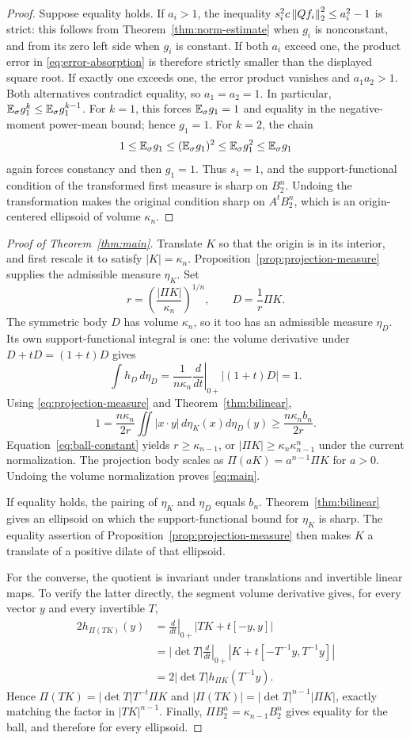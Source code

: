\begin{proof}
Suppose equality holds. If $a_i>1$, the inequality
$s_i^2c\left\lVert Qf_i\right\rVert_2^2\le a_i^2-1$ is strict: this follows from
Theorem~\ref{thm:norm-estimate} when $g_i$ is nonconstant, and from its
zero left side when $g_i$ is constant. If both $a_i$ exceed one, the
product error in \eqref{eq:error-absorption} is therefore strictly
smaller than the displayed square root. If exactly one exceeds one,
the error product vanishes and $a_1a_2>1$.
Both alternatives contradict equality, so $a_1=a_2=1$.
In particular, $\mathbb E_{\sigma} g_1^k\le\mathbb E_{\sigma} g_1^{k-1}$.
For $k=1$, this forces $\mathbb E_{\sigma} g_1=1$ and equality in the negative-moment
power-mean bound; hence $g_1=1$.
For $k=2$, the chain
\[
 1\le\mathbb E_{\sigma} g_1\le(\mathbb E_{\sigma} g_1)^2\le\mathbb E_{\sigma} g_1^2\le\mathbb E_{\sigma} g_1
\]
again forces constancy and then $g_1=1$.
Thus $s_1=1$, and the support-functional condition of the transformed
first measure is sharp on $B_2^n$. Undoing the transformation makes the
original condition sharp on $A^tB_2^n$, which is an origin-centered
ellipsoid of volume $\kappa_n$.
\end{proof}

\begin{proof}[Proof of Theorem~\ref{thm:main}]
Translate $K$ so that the origin is in its interior, and first rescale
it to satisfy $|K|=\kappa_n$.
Proposition~\ref{prop:projection-measure} supplies the admissible
measure $\eta_K$. Set
\[
 r=\left(\frac{|\Pi K|}{\kappa_n}\right)^{1/n},
 \qquad D=\frac1r\Pi K.
\]
The symmetric body $D$ has volume $\kappa_n$, so it too has an
admissible measure $\eta_D$. Its own support-functional integral is
one: the volume derivative under $D+tD=(1+t)D$ gives
\[
 \int h_D\,d\eta_D
 =\frac1{n\kappa_n}\left.\frac{d}{dt}\right|_{0+}|(1+t)D|=1.
\]
Using \eqref{eq:projection-measure} and Theorem~\ref{thm:bilinear},
\[
 1=\frac{n\kappa_n}{2r}
       \iint|x\cdot y|\,d\eta_K(x)d\eta_D(y)
   \ge\frac{n\kappa_nb_n}{2r}.
\]
Equation~\eqref{eq:ball-constant} yields $r\ge\kappa_{n-1}$, or
$|\Pi K|\ge\kappa_n\kappa_{n-1}^n$ under the current normalization.
The projection body scales as $\Pi(aK)=a^{n-1}\Pi K$ for $a>0$.
Undoing the volume normalization proves \eqref{eq:main}.

If equality holds, the pairing of $\eta_K$ and $\eta_D$ equals $b_n$.
Theorem~\ref{thm:bilinear} gives an ellipsoid on which the
support-functional bound for $\eta_K$ is sharp.
The equality assertion of Proposition~\ref{prop:projection-measure}
then makes $K$ a translate of a positive dilate of that ellipsoid.

For the converse, the quotient is invariant under translations and
invertible linear maps. To verify the latter directly, the segment
volume derivative gives, for every vector $y$ and every invertible $T$,
\begin{align*}
 2h_{\Pi(TK)}(y)
 &=\left.\frac{d}{dt}\right|_{0+}|TK+t[-y,y]|\\
 &=|\det T|\left.\frac{d}{dt}\right|_{0+}
              |K+t[-T^{-1}y,T^{-1}y]|\\
 &=2|\det T|h_{\Pi K}(T^{-1}y).
\end{align*}
Hence $\Pi(TK)=|\det T|T^{-t}\Pi K$ and
$|\Pi(TK)|=|\det T|^{n-1}|\Pi K|$, exactly matching the factor in
$|TK|^{n-1}$. Finally, $\Pi B_2^n=\kappa_{n-1}B_2^n$ gives equality
for the ball, and therefore for every ellipsoid.
\end{proof}
